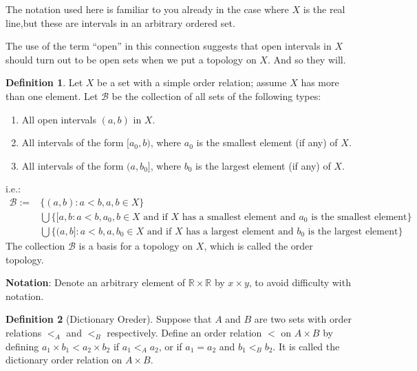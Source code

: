 \documentclass[
]{book}
\providecommand{\tightlist}{%
  \setlength{\itemsep}{0pt}\setlength{\parskip}{0pt}}
\theoremstyle{definition}
\newtheorem{definition}{Definition}[chapter]
\theoremstyle{definition}
\theoremstyle{definition}
\theoremstyle{definition}
\theoremstyle{remark}
\begin{document}
The notation used here is familiar to you already in the case where \(X\) is the real line,but these are intervals in an arbitrary ordered set.

The use of the term ``open'' in this connection suggests that open intervals in \(X\) should turn out to be open sets when we put a topology on \(X\). And so they will.

\begin{definition}
\protect\hypertarget{def:unnamed-chunk-22}{}\label{def:unnamed-chunk-22}Let \(X\) be a set with a simple order relation; assume \(X\) has more than one element. Let \(\mathcal{B}\) be the collection of all sets of the following types:

\begin{enumerate}
\def\labelenumi{\arabic{enumi}.}
\tightlist
\item
  All open intervals \((a, b)\) in \(X\).
\item
  All intervals of the form \([a_0, b)\), where \(a_0\) is the smallest element (if any) of \(X\).
\item
  All intervals of the form \((a, b_0]\), where \(b_0\) is the largest element (if any) of \(X\).
\end{enumerate}

i.e.:
\[\begin{aligned}
\mathcal{B}:=&\{(a,b):a<b, a,b\in X\}\\
& \bigcup \{[a,b:a<b, a_0,b\in X \text{ and if $X$ has a smallest element and $a_0$ is the smallest element}\}\\
& \bigcup \{(a,b]:a<b, a,b_0\in X \text{ and if $X$ has a largest element and $b_0$ is the largest element}\}
\end{aligned}\]
The collection \(\mathcal{B}\) is a basis for a topology on \(X\), which is called the order topology.
\end{definition}

\textbf{Notation}: Denote an arbitrary element of \(\mathbb{R} \times \mathbb{R}\) by \(x \times y\), to avoid difficulty with notation.

\begin{definition}[Dictionary Oreder]
\protect\hypertarget{def:unnamed-chunk-23}{}\label{def:unnamed-chunk-23}Suppose that \(A\) and \(B\) are two sets with order relations \(<_{A}\) and \(<_{B}\) respectively. Define an order relation \(<\) on \(A \times B\) by defining \(a_{1} \times b_{1} < a_{2} \times b_{2}\) if \(a_{1} <_{A} a_{2}\), or if \(a_{1} = a_{2}\) and \(b_{1} <_{B} b_{2}\). It is called the dictionary order relation on \(A \times B\).
\end{definition}
\end{document}
